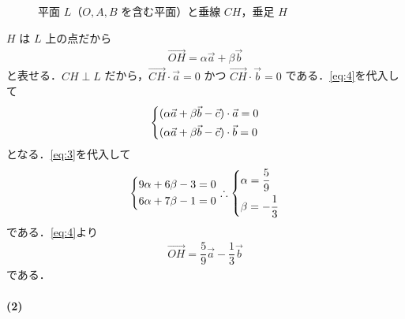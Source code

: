 \documentclass[../../main.tex]{subfiles}
\begin{document}
\begin{figure}[htb]
  \caption{平面 $L$（$O, A, B$ を含む平面）と垂線 $CH$，垂足 $H$}
  \label{fig:plane_L_perpendicular_H}
\end{figure}

$H$ は $L$ 上の点だから
\begin{align}
  \overrightarrow{OH} = \alpha \vec{a} + \beta \vec{b} \label{eq:4}
\end{align}
と表せる．$CH \perp L$ だから，$\overrightarrow{CH} \cdot \vec{a} = 0$ かつ $\overrightarrow{CH} \cdot \vec{b} = 0$ である．\cref{eq:4}を代入して
\begin{align}
  \begin{dcases}
    (\alpha \vec{a} + \beta \vec{b} - \vec{c}) \cdot \vec{a} = 0 \\
    (\alpha \vec{a} + \beta \vec{b} - \vec{c}) \cdot \vec{b} = 0
  \end{dcases}
\end{align}
となる．\cref{eq:3}を代入して
\begin{align}
  \begin{dcases}
    9\alpha + 6\beta - 3 = 0 \\
    6\alpha + 7\beta - 1 = 0
  \end{dcases} \therefore
  \begin{dcases}
    \alpha = \dfrac{5}{9} \\
    \beta = -\dfrac{1}{3}
  \end{dcases}
\end{align}
である．\cref{eq:4}より
\begin{align}
  \overrightarrow{OH} = \dfrac{5}{9}\vec{a} - \dfrac{1}{3}\vec{b} \label{eq:5}
\end{align}
である．

\paragraph{(2)}
\end{document}
